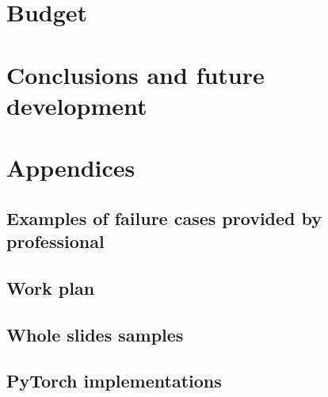 \documentclass[a4paper,12pt,titlepage]{article}
\begin{document}
\section{Budget}\label{sec:budget}


\section{Conclusions and future development}\label{sec:conclusions-and-future-development}


\printbibliography

\appendix
\section*{Appendices}
\renewcommand{\thesubsection}{\Alph{subsection}}

\subsection{Examples of failure cases provided by professional}%
\label{sec:examples}


\subsection{Work plan}


\subsection{Whole slides samples}\label{sec:wholeslides}


\subsection{PyTorch implementations}

\end{document}
